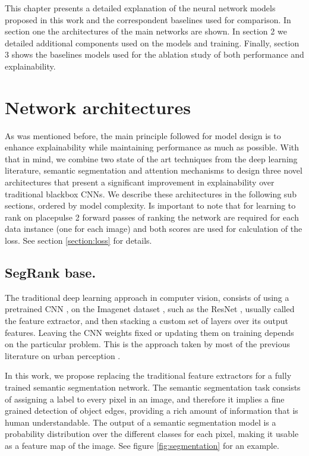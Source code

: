 This chapter presents a detailed explanation of the neural network models proposed in this work and
the correspondent baselines used for comparison. In section one the architectures of
the main networks are shown. In section 2 we detailed additional components used on the models and training.
Finally, section 3 shows the baselines models
used for the ablation study of both performance and explainability.

\section{Network architectures}
As was mentioned before, the main principle followed for model design is to enhance explainability
while maintaining performance as much as possible. With that in mind, we combine two
state of the art techniques from the deep learning literature, semantic segmentation
and attention mechanisms to design three novel architectures that present a significant
improvement in explainability over traditional blackbox CNNs. We describe these architectures
in the following sub sections, ordered by model complexity. Is important to note that
for learning to rank on placepulse
2 forward passes of ranking the network are required for each data instance (one for each image) and both scores are used
for calculation of the loss. See section \ref{section:loss} for  details.


\subsection{SegRank base.}
The traditional deep learning approach in computer vision, consists of using a pretrained
CNN \cite{lecun_mnist}, on the Imagenet dataset \cite{imagenet}, such as the ResNet \cite{he_resnet},
usually called the feature extractor, and then stacking a custom set of layers over its output features. Leaving the CNN weights
fixed or updating them on training  depends on the particular problem. This is the approach taken
by most of the previous literature on urban perception \cite{hidalgo_placepulse,tamara_judgments,zhang_measuring}.

In this work, we propose replacing the traditional feature extractors for a fully trained semantic segmentation
network. The semantic segmentation task consists of assigning a label to every pixel in an image, and therefore
it implies a fine grained detection of object edges, providing a rich amount of information that is human understandable.
The output of a semantic segmentation model is a probability distribution over the different classes for each pixel,
making it usable as a feature map of the image. See figure \ref{fig:segmentation} for an example.


